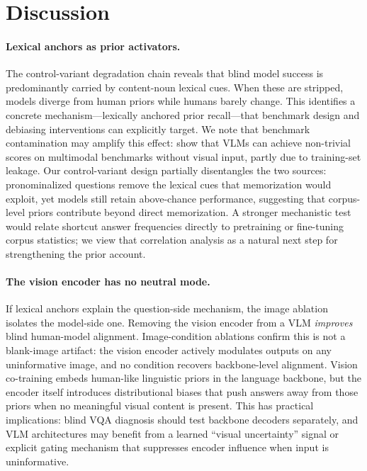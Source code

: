 \documentclass[letterpaper]{article}
\begin{document}
\section{Discussion}

\paragraph{Lexical anchors as prior activators.}
The control-variant degradation chain reveals that blind model success is
predominantly carried by content-noun lexical cues. When these are
stripped, models diverge from human priors while humans barely change.
This identifies a concrete mechanism---lexically anchored prior recall---that
benchmark design and debiasing interventions can explicitly target. We note
that benchmark contamination may amplify this effect: \citet{chen2024are}
show that VLMs can achieve non-trivial scores on multimodal benchmarks
without visual input, partly due to training-set leakage. Our
control-variant design partially disentangles the two sources:
pronominalized questions remove the lexical cues that memorization would
exploit, yet models still retain above-chance performance, suggesting that
corpus-level priors contribute beyond direct memorization. A stronger
mechanistic test would relate shortcut answer frequencies directly to
pretraining or fine-tuning corpus statistics; we view that correlation
analysis as a natural next step for strengthening the prior account.

\paragraph{The vision encoder has no neutral mode.}
If lexical anchors explain the question-side mechanism, the image ablation
isolates the model-side one. Removing the vision encoder from a VLM
\emph{improves} blind human-model alignment. Image-condition ablations
confirm this is not a blank-image artifact: the vision encoder actively
modulates outputs on any uninformative image, and no condition recovers
backbone-level alignment. Vision co-training embeds human-like
linguistic priors in the language backbone, but the encoder itself
introduces distributional biases that push answers away from those priors
when no meaningful visual content is present. This has practical
implications: blind VQA diagnosis should test backbone decoders
separately, and VLM architectures may benefit from a learned
``visual uncertainty'' signal or explicit gating mechanism that suppresses
encoder influence when input is uninformative.
\end{document}
